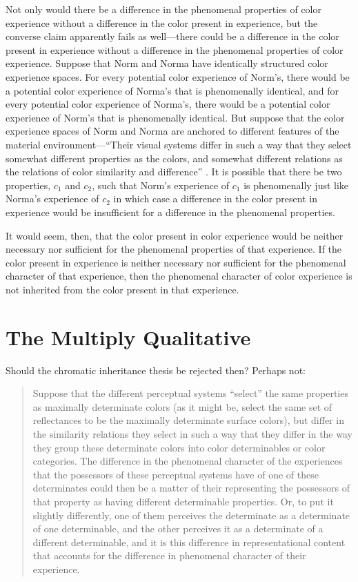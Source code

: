 \documentclass[12pt]{article}
\begin{document}
Not only would there be a difference in the phenomenal properties of color experience without a difference in the color present in experience, but the converse claim apparently fails as well---there could be a difference in the color present in experience without a difference in the phenomenal properties of color experience. Suppose that Norm and Norma have identically structured color experience spaces. For every potential color experience of Norm's, there would be a potential color experience of Norma's that is phenomenally identical, and for every potential color experience of Norma's, there would be a potential color experience of Norm's that is phenomenally identical. But suppose that the color experience spaces of Norm and Norma are anchored to different features of the material environment---``Their visual systems differ in such a way that they select somewhat different properties as the colors, and somewhat different relations as the relations of color similarity and difference'' \citep[p.\ 263]{Shoemaker:wk}. It is possible that there be two properties, $c_1$ and $c_2$, such that Norm's experience of $c_1$ is phenomenally just like Norma's experience of $c_2$ in which case a difference in the color present in experience would be insufficient for a difference in the phenomenal properties.

It would seem, then, that the color present in color experience would be neither necessary nor sufficient for the phenomenal properties of that experience. If the color present in experience is neither necessary nor sufficient for the phenomenal character of that experience, then the phenomenal character of color experience is not inherited from the color present in that experience.



\section{The Multiply Qualitative}\label{sec:the_multiply_qualitative} %

Should the chromatic inheritance thesis be rejected then? Perhaps not: 
\begin{quote}
	Suppose that the different perceptual systems ``select'' the same properties as maximally determinate colors (as it might be, select the same set of reflectances to be the maximally determinate surface colors), but differ in the similarity relations they select in such a way that they differ in the way they group these determinate colors into color determinables or color categories. The difference in the phenomenal character of the experiences that the possessors of these perceptual systems have of one of these determinates could then be a matter of their representing the possessors of that property as having different determinable properties. Or, to put it slightly differently, one of them perceives the determinate as a determinate of one determinable, and the other perceives it as a determinate of a different determinable, and it is this difference in representational content that accounts for the difference in phenomenal character of their experience. \citep[266]{Shoemaker:wk} 
\end{quote}
\end{document}
